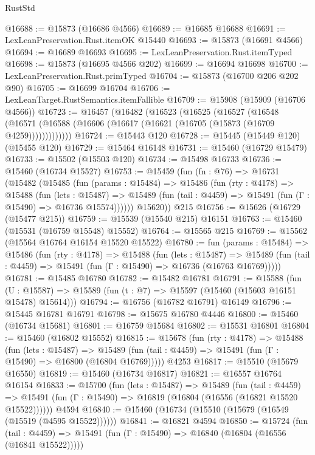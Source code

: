\begin{lexlean}{RustStd}
\begin{coremodule}
@16688 := @15873 (@16686 @4566)
@16689 := @16685 @16688
@16691 := LexLeanPreservation.Rust.itemOK @15440
@16693 := @15873 (@16691 @4566)
@16694 := @16689 @16693
@16695 := LexLeanPreservation.Rust.itemTyped
@16698 := @15873 (@16695 @4566 @202)
@16699 := @16694 @16698
@16700 := LexLeanPreservation.Rust.primTyped
@16704 := @15873 (@16700 @206 @202 @90)
@16705 := @16699 @16704
@16706 := LexLeanTarget.RustSemantics.itemFallible
@16709 := @15908 (@15909 (@16706 @4566))
@16723 := @16457
    (@16482
      (@16523
        (@16525
          (@16527
            (@16548
              (@16571 (@16588 (@16606 (@16617 (@16621 (@16705 (@15873 (@16709 @4259)))))))))))))
@16724 := @15443 @120
@16728 := @15445 (@15449 @120) (@15455 @120)
@16729 := @15464 @16148
@16731 := @15460 (@16729 @15479)
@16733 := @15502 (@15503 @120)
@16734 := @15498 @16733
@16736 := @15460 (@16734 @15527)
@16753 := @15459
    (fun (fn : @76) =>
    @16731
      (@15482
        (@15485
          (fun (params : @15484) =>
          @15486
            (fun (rty : @4178) =>
            @15488
              (fun (lets : @15487) =>
              @15489 (fun (tail : @4459) => @15491 (fun (Γ : @15490) => @16736 @15574))))))
        @15620))
    @215
@16756 := @15626 (@16729 (@15477 @215))
@16759 := @15539 (@15540 @215) @16151
@16763 := @15460 (@15531 (@16759 @15548) @15552)
@16764 := @15565 @215
@16769 := @15562 (@15564 @16764 @16154 @15520 @15522)
@16780 := fun (params : @15484) =>
  @15486
    (fun (rty : @4178) =>
    @15488
      (fun (lets : @15487) =>
      @15489 (fun (tail : @4459) => @15491 (fun (Γ : @15490) => @16736 (@16763 @16769)))))
@16781 := @15485 @16780
@16782 := @15482 @16781
@16791 := @15588
    (fun (U : @15587) => @15589 (fun (t : @7) => @15597 (@15460 (@15603 @16151 @15478) @15614)))
@16794 := @16756 (@16782 @16791) @16149
@16796 := @15445 @16781 @16791
@16798 := @15675 @16780 @4446
@16800 := @15460 (@16734 @15681)
@16801 := @16759 @15684
@16802 := @15531 @16801
@16804 := @15460 (@16802 @15552)
@16815 := @15678
    (fun (rty : @4178) =>
    @15488
      (fun (lets : @15487) =>
      @15489 (fun (tail : @4459) => @15491 (fun (Γ : @15490) => @16800 (@16804 @16769)))))
    @4253
@16817 := @15510 (@15679 @16550)
@16819 := @15460 (@16734 @16817)
@16821 := @16557 @16764 @16154
@16833 := @15700
    (fun (lets : @15487) =>
    @15489
      (fun (tail : @4459) =>
      @15491 (fun (Γ : @15490) => @16819 (@16804 (@16556 (@16821 @15520 @15522))))))
    @4594
@16840 := @15460 (@16734 (@15510 (@15679 (@16549 (@15519 (@4595 @15522))))))
@16841 := @16821 @4594
@16850 := @15724
    (fun (tail : @4459) => @15491 (fun (Γ : @15490) => @16840 (@16804 (@16556 (@16841 @15522)))))

\end{coremodule}
\end{lexlean}
